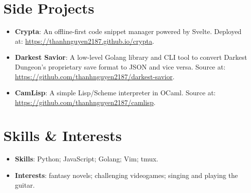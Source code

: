 \documentclass[letterpaper,11pt]{article}
\newcommand{\resumeItem}[2]{
  \item\small{
    \textbf{#1}{: #2 \vspace{-2pt}}
  }
}
\newcommand{\resumeSubItem}[2]{\resumeItem{#1}{#2}\vspace{-4pt}}
\newcommand{\resumeSubHeadingListStart}{\begin{itemize}[leftmargin=*]}
\newcommand{\resumeSubHeadingListEnd}{\end{itemize}}
\begin{document}
\section{Side Projects}
  \resumeSubHeadingListStart
    \resumeSubItem{Crypta}
      {An offline-first code snippet manager powered by Svelte. Deployed at:
      \href{https://thanhnguyen2187.github.io/crypta}{https://thanhnguyen2187.github.io/crypta}.}
    \resumeSubItem{Darkest Savior}
      {A low-level Golang library and CLI tool to convert Darkest Dungeon's
      proprietary save format to JSON and vice versa. Source at:
      \href{https://github.com/thanhnguyen2187/darkest-savior}{https://github.com/thanhnguyen2187/darkest-savior}.}
    \resumeSubItem{CamLisp}
      {A simple Lisp/Scheme interpreter in OCaml. Source at:
      \href{https://github.com/thanhnguyen2187/camlisp}{https://github.com/thanhnguyen2187/camlisp}.}
  \resumeSubHeadingListEnd

\section{Skills \& Interests}
  \resumeSubHeadingListStart
    \resumeSubItem{Skills}{Python; JavaScript; Golang; Vim; tmux.}
    \resumeSubItem{Interests}{fantasy novels; challenging videogames; singing
    and playing the guitar.}
  \resumeSubHeadingListEnd

\end{document}
